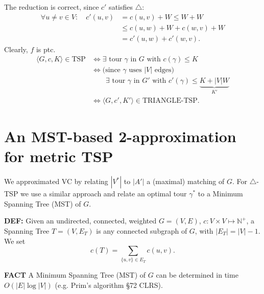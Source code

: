 The reduction is correct, since $c'$ satisfies $\triangle$:
\begin{align*}
\forall u\ne v\in V:\quad c'(u,v)&=c(u,v)+W\leq W+W\\
&\leq c(u,w)+W+c(w,v)+W\\
&=c'(u,w)+c'(w,v).
\end{align*}
Clearly, $f$ is ptc.
\begin{align*}
\langle G,c,K\rangle\in\mathrm{TSP}
&\Longleftrightarrow\exists\text{ tour }\gamma\text{ in $G$ with }c(\gamma)\leq K\\
&\Longleftrightarrow\text{(since $\gamma$ uses $|V|$ edges)}\\
&\qquad\exists\text{ tour }\gamma\text{ in $G'$ with }c'(\gamma)\leq\underbrace{K+|V|W}_{K'}\\
&\Longleftrightarrow\langle G,c',K'\rangle\in\mathrm{TRIANGLE\text{-}TSP}.
\end{align*}
\section{An MST-based 2-approximation for metric TSP}
We approximated VC by relating $|V^*|$ to $|A'|$ a (maximal) matching of $G$. For $\triangle$-TSP we use a similar approach and relate an optimal tour $\gamma^*$ to a Minimum Spanning Tree (MST) of $G$.
\begin{notesdefinition}
\textbf{DEF:} Given an undirected, connected, weighted $G=(V,E)$, $c:V\times V\mapsto\mathbb N^+$, a Spanning Tree $T=(V,E_T)$ is any connected subgraph of $G$, with $|E_T|=|V|-1$. We set
\[c(T)=\sum_{\{u,v\}\in E_T}c(u,v).\]
\end{notesdefinition}
\begin{notesresult}
\textbf{FACT} A Minimum Spanning Tree (MST) of $G$ can be determined in time $O(|E|\log|V|)$ (e.g. Prim's algorithm \S72 CLRS).
\end{notesresult}
